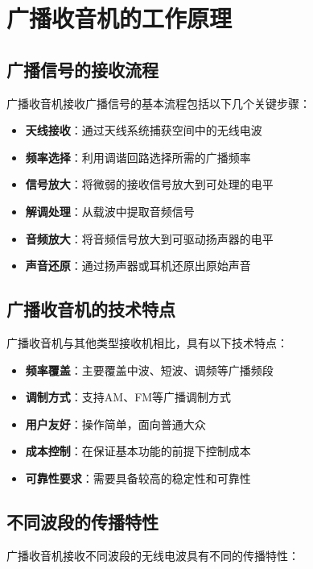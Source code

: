 \documentclass[12pt,UTF8]{ctexbook}
\begin{document}
\section{广播收音机的工作原理}

\subsection{广播信号的接收流程}

广播收音机接收广播信号的基本流程包括以下几个关键步骤：

\begin{itemize}[leftmargin=3.5em]
    \item \textbf{天线接收}：通过天线系统捕获空间中的无线电波
    \item \textbf{频率选择}：利用调谐回路选择所需的广播频率
    \item \textbf{信号放大}：将微弱的接收信号放大到可处理的电平
    \item \textbf{解调处理}：从载波中提取音频信号
    \item \textbf{音频放大}：将音频信号放大到可驱动扬声器的电平
    \item \textbf{声音还原}：通过扬声器或耳机还原出原始声音
\end{itemize}

\subsection{广播收音机的技术特点}

广播收音机与其他类型接收机相比，具有以下技术特点：

\begin{itemize}[leftmargin=3.5em]
    \item \textbf{频率覆盖}：主要覆盖中波、短波、调频等广播频段
    \item \textbf{调制方式}：支持AM、FM等广播调制方式
    \item \textbf{用户友好}：操作简单，面向普通大众
    \item \textbf{成本控制}：在保证基本功能的前提下控制成本
    \item \textbf{可靠性要求}：需要具备较高的稳定性和可靠性
\end{itemize}

\subsection{不同波段的传播特性}

广播收音机接收不同波段的无线电波具有不同的传播特性：
\end{document}
